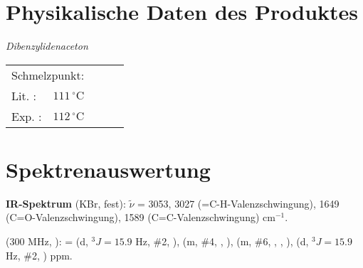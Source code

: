 \documentclass[12pt]{article}
\begin{document}
\begin{onehalfspace}
\section{Physikalische Daten des Produktes} 
\textit{Dibenzylidenaceton} \\[0.2cm]
\begin{tabular}{ lrclc }
 \multicolumn{2}{l}{Schmelzpunkt:} & &   \\
   Lit. \cite{organikum} : & $ 111 \,^{\circ}\mathrm{C} $ & &  \\
   Exp. :& $ 112 \,^{\circ}\mathrm{C} $ & &  \\
 \end{tabular}

\section{Spektrenauswertung} 
\textbf{IR-Spektrum} (KBr, fest): $\tilde{\nu}$ = 3053, 3027 (=C-H-Valenzschwingung), 1649 (C=O-Valenzschwingung), 1589 (C=C-Valenzschwingung) cm$^{-1}$.\\

\begin{experimental}[format=\bfseries,delta=(ppm),list=true,use-equal,pos-number = side]
\begin{minipage}[b]{0.6\textwidth} 
\NMR* (300 \si{\MHz}, ): \chemdelta = 
 (d, $^{3\!}J = 15.9$ \si{\Hz}, \#{2}, ),
 (m, \#{4}, , ),
 (m, \#{6}, , , ),
 (d, $^{3\!}J = 15.9$ \si{\Hz}, \#{2}, ) ppm.
\end{minipage}
 \hfill
\begin{minipage}[t][][b]{0.40\textwidth} 
\end{minipage}
\end{experimental}


\end{onehalfspace}
\end{document}
